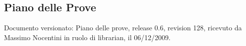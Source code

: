 \subsection{Piano delle Prove}
Documento versionato: Piano delle prove, release 0.6, revision 128, ricevuto da
Massimo Nocentini in ruolo di librarian, il 06/12/2009.